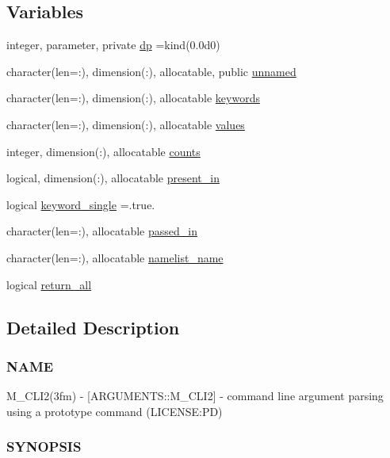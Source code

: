 \subsection*{Variables}
\begin{DoxyCompactItemize}
\item 
integer, parameter, private \mbox{\hyperlink{namespacem__cli2_acf83f1963cf6a56ad0221cfcf5402440}{dp}} =kind(0.\+0d0)
\item 
character(len=\+:), dimension(\+:), allocatable, public \mbox{\hyperlink{namespacem__cli2_a5b03781cb432174f4ee8d734ecbb9604}{unnamed}}
\item 
character(len=\+:), dimension(\+:), allocatable \mbox{\hyperlink{namespacem__cli2_a314f3903115db4ab9e2ec03b540aec76}{keywords}}
\item 
character(len=\+:), dimension(\+:), allocatable \mbox{\hyperlink{namespacem__cli2_af631ee3a1bca98e9fbf1f80646dae360}{values}}
\item 
integer, dimension(\+:), allocatable \mbox{\hyperlink{namespacem__cli2_abf81746a55c2218c7f2de15602bc0be8}{counts}}
\item 
logical, dimension(\+:), allocatable \mbox{\hyperlink{namespacem__cli2_adf9ffb8a34d1bd666fa91ed953bcb9f4}{present\+\_\+in}}
\item 
logical \mbox{\hyperlink{namespacem__cli2_a7f0b96691836126dc7f258a3da75b494}{keyword\+\_\+single}} =.true.
\item 
character(len=\+:), allocatable \mbox{\hyperlink{namespacem__cli2_a649439045139e5473091df65ecde6a4b}{passed\+\_\+in}}
\item 
character(len=\+:), allocatable \mbox{\hyperlink{namespacem__cli2_a46b2d1d3b3dbe6fb8b96c7459f3e8046}{namelist\+\_\+name}}
\item 
logical \mbox{\hyperlink{namespacem__cli2_abbcd01a5c2a1e6030d09f3a5dbe1fa45}{return\+\_\+all}}
\end{DoxyCompactItemize}


\subsection{Detailed Description}
\subsubsection*{N\+A\+ME}

M\+\_\+\+C\+L\+I2(3fm) -\/ \mbox{[}A\+R\+G\+U\+M\+E\+N\+T\+S\+::\+M\+\_\+\+C\+L\+I2\mbox{]} -\/ command line argument parsing using a prototype command (L\+I\+C\+E\+N\+SE\+:PD) \subsubsection*{S\+Y\+N\+O\+P\+S\+IS}

